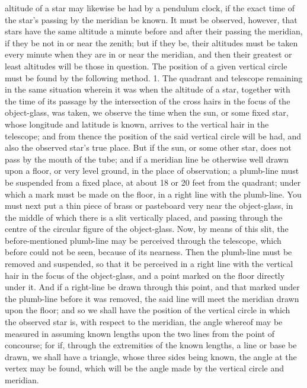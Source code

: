 \documentclass{article}
\begin{document}
altitude of a star may likewise be had by a pendulum clock, if the exact time of the star's passing by the meridian be known. It must be observed, however, that stars have the same altitude a minute before and after their passing the meridian, if they be not in or near the zenith; but if they be, their altitudes must be taken every minute when they are in or near the meridian, and then their greatest or least altitudes will be those in question. The position of a given vertical circle must be found by the following method. 1. The quadrant and telescope remaining in the same situation wherein it was when the altitude of a star, together with the time of its passage by the intersection of the cross hairs in the focus of the object-glass, was taken, we observe the time when the sun, or some fixed star, whose longitude and latitude is known, arrives to the vertical hair in the telescope; and from thence the position of the said vertical circle will be had, and also the observed star's true place. But if the sun, or some other star, does not pass by the mouth of the tube; and if a meridian line be otherwise well drawn upon a floor, or very level ground, in the place of observation; a plumb-line must be suspended from a fixed place, at about 18 or 20 feet from the quadrant; under which a mark must be made on the floor, in a right line with the plumb-line. You must next put a thin piece of brass or pasteboard very near the object-glass, in the middle of which there is a slit vertically placed, and passing through the centre of the circular figure of the object-glass. Now, by means of this slit, the before-mentioned plumb-line may be perceived through the telescope, which before could not be seen, because of its nearness. Then the plumb-line must be removed and suspended, so that it be perceived in a right line with the vertical hair in the focus of the object-glass, and a point marked on the floor directly under it. And if a right-line be drawn through this point, and that marked under the plumb-line before it was removed, the said line will meet the meridian drawn upon the floor; and so we shall have the position of the vertical circle in which the observed star is, with respect to the meridian, the angle whereof may be measured in assuming known lengths upon the two lines from the point of concourse; for if, through the extremities of the known lengths, a line or base be drawn, we shall have a triangle, whose three sides being known, the angle at the vertex may be found, which will be the angle made by the vertical circle and meridian.
\end{document}
